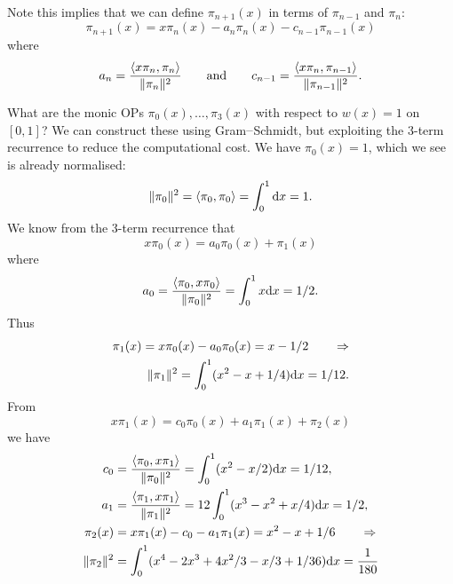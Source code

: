 Note this implies that we can define $\ensuremath{\pi}_{n+1}(x)$ in terms of $\ensuremath{\pi}_{n-1}$ and $\ensuremath{\pi}_n$:
\[
\ensuremath{\pi}_{n+1}(x) = x \ensuremath{\pi}_n(x) - a_n \ensuremath{\pi}_n(x) - c_{n-1} \ensuremath{\pi}_{n-1}(x)
\]
where
\[
a_n = {\ensuremath{\langle}x \ensuremath{\pi}_n, \ensuremath{\pi}_n\ensuremath{\rangle} \over \| \ensuremath{\pi}_n\|^2} \qquad \hbox{and} \qquad c_{n-1} = {\ensuremath{\langle}x \ensuremath{\pi}_n, \ensuremath{\pi}_{n-1}\ensuremath{\rangle} \over \| \ensuremath{\pi}_{n-1}\|^2}.
\]
\begin{example} What are the  monic OPs $\ensuremath{\pi}_0(x),\ensuremath{\ldots},\ensuremath{\pi}_3(x)$ with respect to $w(x) = 1$ on $[0,1]$? We can construct these using Gram\ensuremath{\endash}Schmidt, but exploiting the 3-term recurrence to reduce the computational cost. We have $\ensuremath{\pi}_0(x) = 1$, which we see is already normalised:
\[
\|\ensuremath{\pi}_0\|^2 = \ensuremath{\langle}\ensuremath{\pi}_0,\ensuremath{\pi}_0\ensuremath{\rangle} = \ensuremath{\int}_0^1 {\rm d} x = 1.
\]
We know from the 3-term recurrence that
\[
x \ensuremath{\pi}_0(x) = a_0 \ensuremath{\pi}_0(x) +  \ensuremath{\pi}_1(x)
\]
where
\[
a_0 = {\ensuremath{\langle}\ensuremath{\pi}_0,x \ensuremath{\pi}_0\ensuremath{\rangle}  \over \|\ensuremath{\pi}_0\|^2} = \ensuremath{\int}_0^1 x {\rm d} x = 1/2.
\]
Thus
\begin{align*}
\ensuremath{\pi}_1(x) = x \ensuremath{\pi}_0(x) - a_0 \ensuremath{\pi}_0(x) = x-1/2 \qquad  \ensuremath{\Rightarrow} \\
\|\ensuremath{\pi}_1\|^2 = \ensuremath{\int}_0^1 (x^2 - x + 1/4) {\rm d} x = 1/12.    
\end{align*}
From
\[
x \ensuremath{\pi}_1(x) = c_0 \ensuremath{\pi}_0(x) + a_1 \ensuremath{\pi}_1(x) +  \ensuremath{\pi}_2(x)
\]
we have
\begin{align*}
c_0 &= {\ensuremath{\langle}\ensuremath{\pi}_0,x \ensuremath{\pi}_1\ensuremath{\rangle}  \over \|\ensuremath{\pi}_0\|^2} = \ensuremath{\int}_0^1 (x^2 - x/2) {\rm d} x = 1/12, \\
a_1 &= {\ensuremath{\langle}\ensuremath{\pi}_1,x \ensuremath{\pi}_1\ensuremath{\rangle}  \over \|\ensuremath{\pi}_1\|^2} = 12 \ensuremath{\int}_0^1 (x^3 - x^2 + x/4) {\rm d} x = 1/2, \\
\ensuremath{\pi}_2(x) &= x \ensuremath{\pi}_1(x) - c_0 - a_1 \ensuremath{\pi}_1(x) = x^2 - x + 1/6 \qquad \ensuremath{\Rightarrow} \\
\|\ensuremath{\pi}_2\|^2 &= \int_0^1 (x^4 - 2x^3 + 4x^2/3 - x/3 + 1/36) {\rm d} x = {1 \over 180}

\end{align*}
\end{example}
